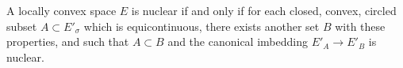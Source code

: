 A locally convex space $E$ is nuclear if and only if for each closed, convex, circled subset $A \subset E'_\sigma$ which is equicontinuous, there exists another set $B$ with these properties, and such that $A \subset B$ and the canonical imbedding $E'_A \to E'_B$ is nuclear.
